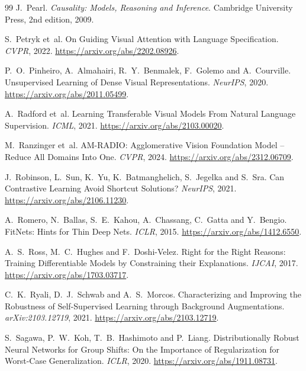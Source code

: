 \documentclass[11pt]{article}
\begin{document}
\begin{thebibliography}{99}
J.~Pearl. \emph{Causality: Models, Reasoning and Inference}. Cambridge University Press, 2nd edition, 2009.

S.~Petryk et~al. On Guiding Visual Attention with Language Specification. \emph{CVPR}, 2022.
\url{https://arxiv.org/abs/2202.08926}.

P.~O.~Pinheiro, A.~Almahairi, R.~Y.~Benmalek, F.~Golemo and A.~Courville. Unsupervised Learning of Dense Visual
Representations. \emph{NeurIPS}, 2020. \url{https://arxiv.org/abs/2011.05499}.

A.~Radford et~al. Learning Transferable Visual Models From Natural Language Supervision. \emph{ICML}, 2021.
\url{https://arxiv.org/abs/2103.00020}.

M.~Ranzinger et~al. AM-RADIO: Agglomerative Vision Foundation Model -- Reduce All Domains Into One. \emph{CVPR}, 2024.
\url{https://arxiv.org/abs/2312.06709}.

J.~Robinson, L.~Sun, K.~Yu, K.~Batmanghelich, S.~Jegelka and S.~Sra. Can Contrastive Learning Avoid Shortcut
Solutions? \emph{NeurIPS}, 2021. \url{https://arxiv.org/abs/2106.11230}.

A.~Romero, N.~Ballas, S.~E.~Kahou, A.~Chassang, C.~Gatta and Y.~Bengio. FitNets: Hints for Thin Deep Nets. \emph{ICLR},
2015. \url{https://arxiv.org/abs/1412.6550}.

A.~S.~Ross, M.~C.~Hughes and F.~Doshi-Velez. Right for the Right Reasons: Training Differentiable Models by
Constraining their Explanations. \emph{IJCAI}, 2017. \url{https://arxiv.org/abs/1703.03717}.

C.~K.~Ryali, D.~J.~Schwab and A.~S.~Morcos. Characterizing and Improving the Robustness of Self-Supervised Learning
through Background Augmentations. \emph{arXiv:2103.12719}, 2021. \url{https://arxiv.org/abs/2103.12719}.

S.~Sagawa, P.~W.~Koh, T.~B.~Hashimoto and P.~Liang. Distributionally Robust Neural Networks for Group Shifts: On the
Importance of Regularization for Worst-Case Generalization. \emph{ICLR}, 2020. \url{https://arxiv.org/abs/1911.08731}.


\end{thebibliography}
\end{document}
